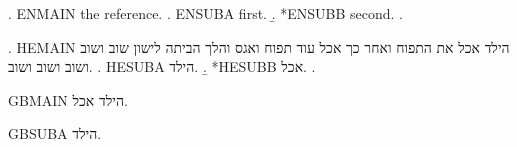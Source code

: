 

\ex. ENMAIN the reference.
\a. ENSUBA first.
\b. *ENSUBB second.
\z.

\begin{hebrew}
\ex. \textenglish{HEMAIN} הילד אכל את התפוח ואחר כך אכל עוד תפוח ואגס והלך הביתה לישון שוב ושוב ושוב ושוב ושוב.
\a. \textenglish{HESUBA} הילד.
\b. *\textenglish{HESUBB} אכל.
\z.

\begin{exe}
\ex \textenglish{GBMAIN} הילד אכל.
\begin{xlist}
\ex \textenglish{GBSUBA} הילד.
\end{xlist}
\end{exe}
\end{hebrew}

